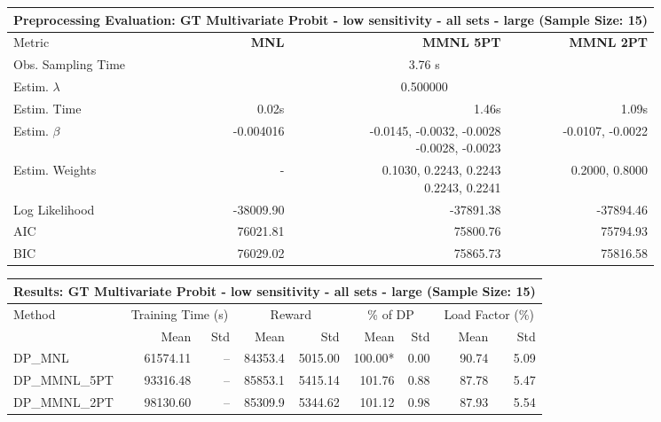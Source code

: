 
\begin{samepage}
\begin{center}
  \small
  \begin{tabular}{l|r|r|r}
    \toprule
    \multicolumn{4}{c}{\textbf{Preprocessing Evaluation: GT Multivariate Probit - low sensitivity - all sets - large (Sample Size: 15)}} \\
    \midrule
    Metric & \textbf{MNL} & \textbf{MMNL 5PT} & \textbf{MMNL 2PT} \\
    \midrule
    Obs. Sampling Time & \multicolumn{3}{c}{3.76 s} \\
    Estim. $\lambda$ & \multicolumn{3}{c}{0.500000} \\
    Estim. Time & 0.02s & 1.46s & 1.09s \\
    Estim. $\beta$ & -0.004016 & \makecell[tr]{-0.0145, -0.0032, -0.0028 \\ -0.0028, -0.0023} & -0.0107, -0.0022 \\
    Estim. Weights & - & \makecell[tr]{0.1030, 0.2243, 0.2243 \\ 0.2243, 0.2241} & 0.2000, 0.8000 \\
    Log Likelihood & -38009.90 & -37891.38 & -37894.46 \\
    AIC & 76021.81 & 75800.76 & 75794.93 \\
    BIC & 76029.02 & 75865.73 & 75816.58 \\
    \bottomrule
  \end{tabular}
\end{center}
\begin{center}
  \small
  \begin{tabular}{l|rr|rr|rr|rr}
    \toprule
    \multicolumn{9}{c}{\textbf{Results: GT Multivariate Probit - low sensitivity - all sets - large (Sample Size: 15)}} \\
    \midrule
    Method & \multicolumn{2}{c|}{Training Time (s)} & \multicolumn{2}{c|}{Reward} & \multicolumn{2}{c|}{\% of DP} & \multicolumn{2}{c}{Load Factor (\%)} \\
    & Mean & Std & Mean & Std & Mean & Std & Mean & Std \\
    \midrule
    DP\_MNL      & 61574.11 &    -- &    84353.4 &    5015.00 & 100.00* &    0.00 &   90.74 &    5.09 \\
    DP\_MMNL\_5PT & 93316.48 &    -- &    85853.1 &    5415.14 &  101.76 &    0.88 &   87.78 &    5.47 \\
    DP\_MMNL\_2PT & 98130.60 &    -- &    85309.9 &    5344.62 &  101.12 &    0.98 &   87.93 &    5.54 \\

\end{tabular}
\end{center}
\end{samepage}
